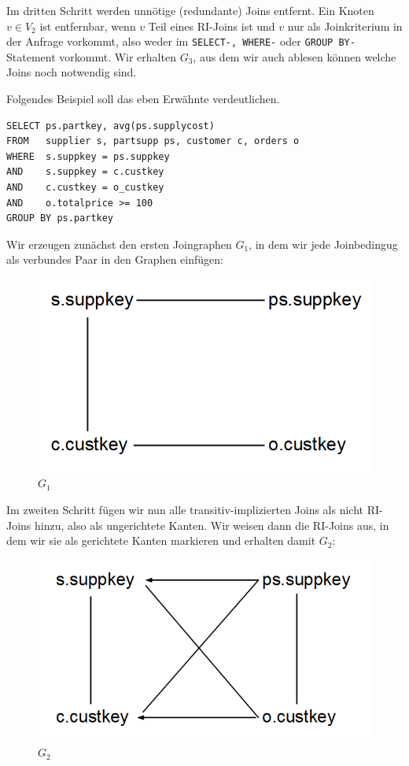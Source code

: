 Im dritten Schritt werden unnötige (redundante) Joins entfernt. Ein Knoten $v\in V_2$ ist entfernbar, wenn $v$ Teil eines RI-Joins ist und $v$ nur als Joinkriterium in der Anfrage vorkommt, also weder im \verb|SELECT-, WHERE-| oder \verb|GROUP BY-|Statement vorkommt. Wir erhalten $G_3$, aus dem wir auch ablesen können welche Joins noch notwendig sind. 

Folgendes Beispiel soll das eben Erwähnte verdeutlichen.

\begin{lstlisting}[mathescape]
SELECT ps.partkey, avg(ps.supplycost)
FROM   supplier s, partsupp ps, customer c, orders o
WHERE  s.suppkey = ps.suppkey 
AND    s.suppkey = c.custkey
AND    c.custkey = o_custkey
AND    o.totalprice >= 100
GROUP BY ps.partkey
\end{lstlisting}

Wir erzeugen zunächst den ersten Joingraphen $G_1$, in dem wir jede Joinbedingug als verbundes Paar in den Graphen einfügen:

\begin{figure}[h]
\includegraphics[scale=0.4]{Bilder/joinelem_g1.png}
\caption{$G_1$}
\end{figure}

Im zweiten Schritt fügen wir nun alle transitiv-implizierten Joins als nicht RI-Joins hinzu, also als ungerichtete Kanten. Wir weisen dann die RI-Joins aus, in dem wir sie als gerichtete Kanten markieren und erhalten damit $G_2$:

\begin{figure}[h]
\includegraphics[scale=0.4]{Bilder/joinelem_g2.png}
\caption{$G_2$}
\end{figure}

